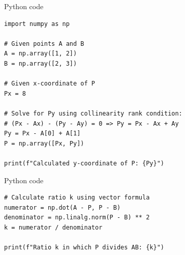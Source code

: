 \documentclass{beamer}
\begin{document}
\begin{frame}[fragile]{Python code}
    \begin{verbatim}
import numpy as np

# Given points A and B
A = np.array([1, 2])
B = np.array([2, 3])

# Given x-coordinate of P
Px = 8

# Solve for Py using collinearity rank condition:
# (Px - Ax) - (Py - Ay) = 0 => Py = Px - Ax + Ay
Py = Px - A[0] + A[1]
P = np.array([Px, Py])

print(f"Calculated y-coordinate of P: {Py}")
    \end{verbatim}
\end{frame}
\begin{frame}[fragile]{Python code}
    \begin{verbatim}
# Calculate ratio k using vector formula
numerator = np.dot(A - P, P - B)
denominator = np.linalg.norm(P - B) ** 2
k = numerator / denominator

print(f"Ratio k in which P divides AB: {k}")

    \end{verbatim}
\end{frame}
\end{document}
